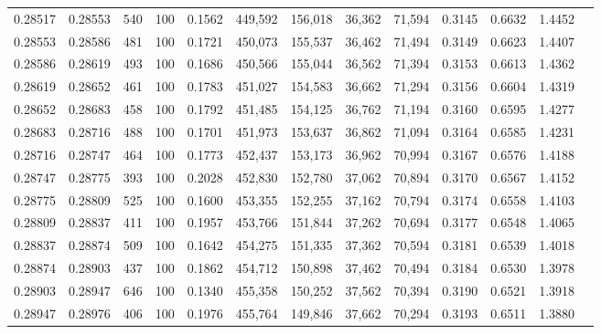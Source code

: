 \begin{tabular}{rrrrrrrrrrrrr}
0.28517 & 0.28553 &   540 & 100 &                                     0.1562 & 449,592 & 156,018 &  36,362 &  71,594 & 0.3145 & 0.6632 & 1.4452 \\
0.28553 & 0.28586 &   481 & 100 &                                     0.1721 & 450,073 & 155,537 &  36,462 &  71,494 & 0.3149 & 0.6623 & 1.4407 \\
0.28586 & 0.28619 &   493 & 100 &                                     0.1686 & 450,566 & 155,044 &  36,562 &  71,394 & 0.3153 & 0.6613 & 1.4362 \\
0.28619 & 0.28652 &   461 & 100 &                                     0.1783 & 451,027 & 154,583 &  36,662 &  71,294 & 0.3156 & 0.6604 & 1.4319 \\
0.28652 & 0.28683 &   458 & 100 &                                     0.1792 & 451,485 & 154,125 &  36,762 &  71,194 & 0.3160 & 0.6595 & 1.4277 \\
0.28683 & 0.28716 &   488 & 100 &                                     0.1701 & 451,973 & 153,637 &  36,862 &  71,094 & 0.3164 & 0.6585 & 1.4231 \\
0.28716 & 0.28747 &   464 & 100 &                                     0.1773 & 452,437 & 153,173 &  36,962 &  70,994 & 0.3167 & 0.6576 & 1.4188 \\
0.28747 & 0.28775 &   393 & 100 &                                     0.2028 & 452,830 & 152,780 &  37,062 &  70,894 & 0.3170 & 0.6567 & 1.4152 \\
0.28775 & 0.28809 &   525 & 100 &                                     0.1600 & 453,355 & 152,255 &  37,162 &  70,794 & 0.3174 & 0.6558 & 1.4103 \\
0.28809 & 0.28837 &   411 & 100 &                                     0.1957 & 453,766 & 151,844 &  37,262 &  70,694 & 0.3177 & 0.6548 & 1.4065 \\
0.28837 & 0.28874 &   509 & 100 &                                     0.1642 & 454,275 & 151,335 &  37,362 &  70,594 & 0.3181 & 0.6539 & 1.4018 \\
0.28874 & 0.28903 &   437 & 100 &                                     0.1862 & 454,712 & 150,898 &  37,462 &  70,494 & 0.3184 & 0.6530 & 1.3978 \\
0.28903 & 0.28947 &   646 & 100 &                                     0.1340 & 455,358 & 150,252 &  37,562 &  70,394 & 0.3190 & 0.6521 & 1.3918 \\
0.28947 & 0.28976 &   406 & 100 &                                     0.1976 & 455,764 & 149,846 &  37,662 &  70,294 & 0.3193 & 0.6511 & 1.3880 \\

\end{tabular}
